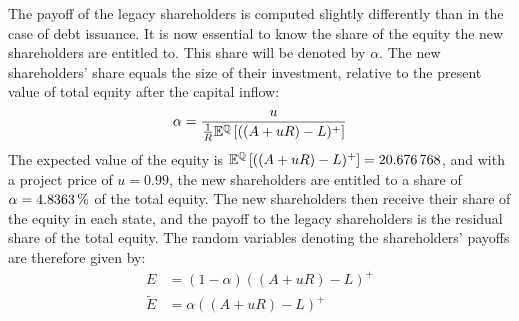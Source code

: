 \documentclass[main.tex]{subfiles}
\begin{document}
        The payoff of the legacy shareholders is computed slightly differently than in the case of debt issuance. 
        It is now essential to know the share of the equity the new shareholders are entitled to.
        This share will be denoted by $\alpha$.
        The new shareholders' share equals the size of their investment,
        relative to the present value of total equity after the capital inflow:
        \begin{equation*}
            \alpha = 
                \frac{
                    u
                }{
                    \frac{1}{R}
                    \mathbb{E}^{\mathbb{Q}}\left[
                        ((A+uR) - L)^{+}
                    \right]
                }
        \end{equation*}
        The expected value of the equity is 
        $\mathbb{E}^{\mathbb{Q}}\left[((A+uR) - L)^{+}\right] = \num{20.676768}$,
        and with a project price of $u = 0.99$, the new shareholders are entitled to a share of
        $\alpha = \pct{0.048363}$ of the total equity.
        The new shareholders then receive their share of the equity in each state, 
        and the payoff to the legacy shareholders is the residual share of the total equity.
        The random variables denoting the shareholders' payoffs are therefore given by:
            \begin{align*}
                E 
                &= 
                (1 - \alpha)
                ((A+uR) - L)^{+} 
                \\
                \tilde{E}
                &=
                \alpha
                ((A+uR) - L)^{+}
            \end{align*}
        
\end{document}
